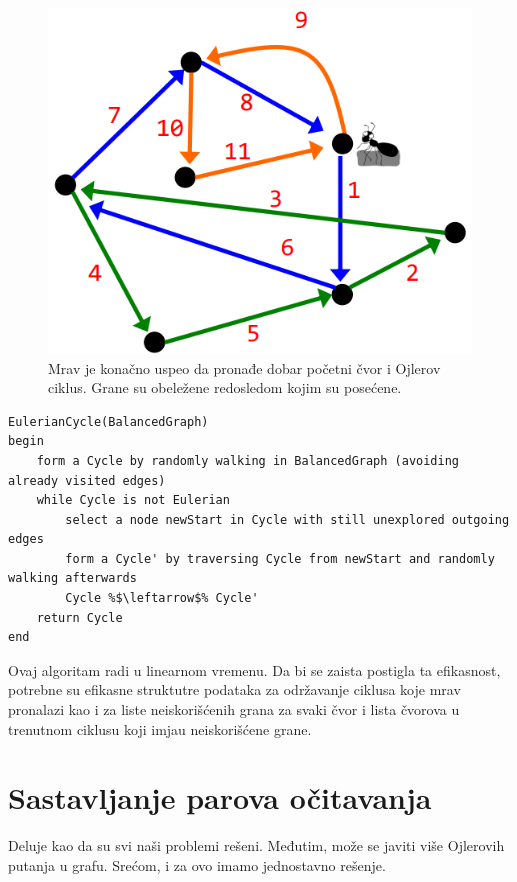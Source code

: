 \begin{minipage}{\textwidth}
\begin{minipage}{0.45\textwidth}
\begin{figure}[H]
			\includegraphics[width=\textwidth]{poglavlja/3/slike/mrav4.png}
			\caption{Mrav je konačno uspeo da pronađe dobar početni čvor i Ojlerov ciklus. Grane su obeležene redosledom kojim su posećene.}
			\label{slika:mrav4}
		\end{figure} 
	\end{minipage}
	\vspace*{1em}
\end{minipage}

\begin{lstlisting}
EulerianCycle(BalancedGraph)
begin
	form a Cycle by randomly walking in BalancedGraph (avoiding already visited edges)
	while Cycle is not Eulerian
		select a node newStart in Cycle with still unexplored outgoing edges
		form a Cycle' by traversing Cycle from newStart and randomly walking afterwards
		Cycle %$\leftarrow$% Cycle'
	return Cycle
end
\end{lstlisting}

Ovaj algoritam radi u linearnom vremenu. Da bi se zaista postigla ta efikasnost, potrebne su efikasne struktutre podataka za održavanje ciklusa koje mrav pronalazi kao i za liste neiskorišćenih grana za svaki čvor i lista čvorova u trenutnom ciklusu koji imjau neiskorišćene grane.

\section{Sastavljanje parova očitavanja}

Deluje kao da su svi naši problemi rešeni. Međutim, može se javiti više Ojlerovih putanja u grafu. Srećom, i za ovo imamo jednostavno rešenje.

